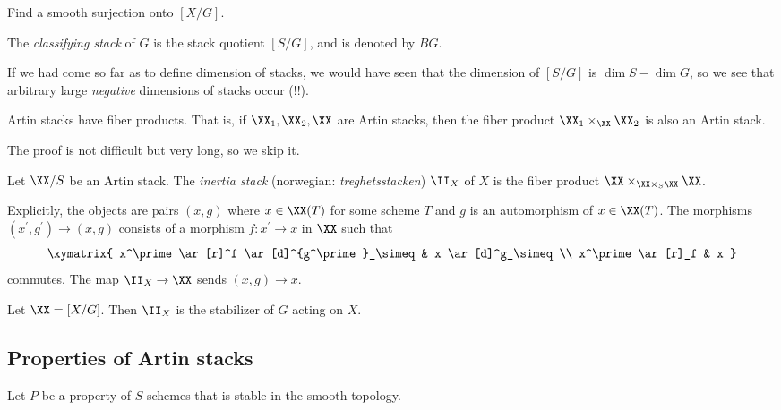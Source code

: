 \documentclass[11pt, english]{article}
\begin{document}
\begin{exc}
 Find a smooth surjection onto $[X/G]$.
\end{exc}
\begin{sol}

\end{sol}

\begin{defi}
The \emph{classifying stack} of $G$ is the stack quotient $[S/G]$, and is denoted by $BG$.
\end{defi}
\begin{remark}
If we had come so far as to define dimension of stacks, we would have seen that the dimension of $[S/G]$ is $\dim S - \dim G$, so we see that arbitrary large \emph{negative} dimensions of stacks occur (!!).
\end{remark}

\begin{lemma}
Artin stacks have fiber products. That is, if $\XX_1,\XX_2, \XX$ are Artin stacks, then the fiber product $\XX_1 \times_\XX \XX_2$ is also an Artin stack.
\end{lemma}
The proof is not difficult but very long, so we skip it.

\begin{defi}
Let $\XX/S$ be an Artin stack. The \emph{inertia stack}
 (norwegian: \emph{treghetsstacken}) $\II_X$ of $X$ is the fiber product $\XX \times_{\XX \times_S \XX} \XX$.
\end{defi}

Explicitly, the objects are pairs $(x,g)$ where $x \in \XX(T)$ for some scheme $T$ and $g$ is an automorphism of $x \in \XX(T)$. The morphisms $(x^\prime,g^\prime) \to (x,g)$  consists of a morphism $f:x^\prime \to x$ in $\XX$ such that 
\[
\xymatrix{
x^\prime \ar[r]^f \ar[d]^{g^\prime}_\simeq & x \ar[d]^g_\simeq \\
x^\prime \ar[r]_f & x
}
\]
commutes. The map $\II_X \to \XX$ sends $(x,g) \to x$. 

\begin{example}
Let $\XX=[X/G]$. Then $\II_X$ is the stabilizer of $G$ acting on $X$. 
\end{example}

\subsection{Properties of Artin stacks}

Let $P$ be a property of $S$-schemes that is stable in the smooth topology.
\end{document}
